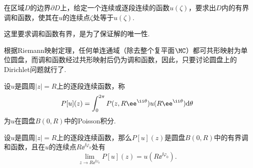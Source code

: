 在区域$D$的边界$\partial D$上，给定一个连续或逐段连续的函数$u(\zeta)$，要求出$D$内的有界调和函数，使其在$u$的连续点$\zeta$处等于$u(\zeta)$.

这里要求调和函数有界，是为了保证解的唯一性.

根据Riemann映射定理，任何单连通域（除去整个复平面$\MC$）都可共形映射为单位圆盘，而调和函数经过共形映射后仍为调和函数，因此，只要讨论圆盘上的Dirichlet问题就行了.

设$u$是圆周$|z|=R$上的逐段连续函数，称
\begin{equation}\label{eq8.2.1}
P[u](z)=\int_0^{2\pi}P(z,R\ee^{\ii\theta})u(R\ee^{\ii\theta})\textrm d\theta
\end{equation}
为$u$在圆盘$B(0,R)$中的Poisson积分.
\begin{theorem}\label{thm8.2.1}
设$u$是圆周$|z|=R$上的逐段连续函数，那么$P[u](z)$是圆盘$B(0,R)$中的有界调和函数，且在$u$的连续点$R\ee^{\ii\varphi_0}$处有
\begin{equation}\label{eq8.2.2}
\lim_{z\to R\ee^{\ii\varphi_0}}P[u](z)=u(R\ee^{\ii\varphi_0}).
\end{equation}
\end{theorem}
